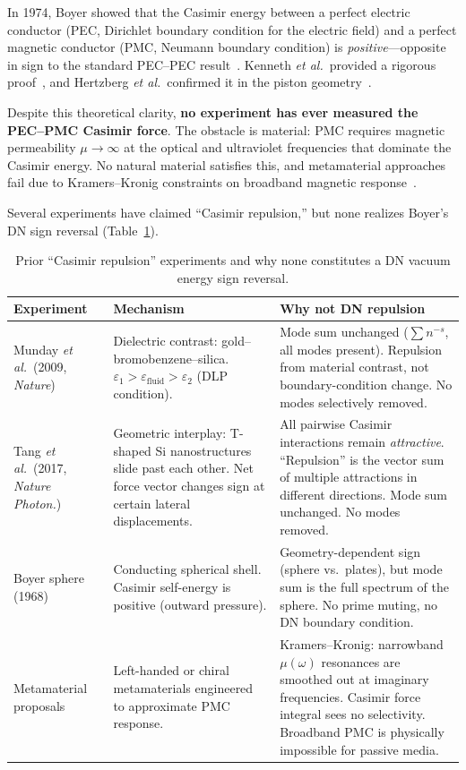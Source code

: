 \documentclass[aps,prd,twocolumn,superscriptaddress,nofootinbib]{revtex4-2}
\begin{document}
In 1974, Boyer showed that the Casimir energy between a perfect
electric conductor (PEC, Dirichlet boundary condition for the
electric field) and a perfect magnetic conductor (PMC, Neumann
boundary condition) is \emph{positive}---opposite in sign to the
standard PEC--PEC result~\cite{Boyer1974}.  Kenneth \textit{et al.}\
provided a rigorous proof~\cite{Kenneth2002}, and Hertzberg
\textit{et al.}\ confirmed it in the piston
geometry~\cite{Hertzberg2005}.

Despite this theoretical clarity, \textbf{no experiment has ever
measured the PEC--PMC Casimir force}.  The obstacle is material:
PMC requires magnetic permeability $\mu\to\infty$ at the optical
and ultraviolet frequencies that dominate the Casimir energy.
No natural material satisfies this, and metamaterial approaches
fail due to Kramers--Kronig constraints on
broadband magnetic response~\cite{Rosa2008}.

Several experiments have claimed ``Casimir repulsion,'' but none
realizes Boyer's DN sign reversal (Table~\ref{tab:prior}).

\begin{table}[b]
\caption{Prior ``Casimir repulsion'' experiments and why none
constitutes a DN vacuum energy sign reversal.}
\label{tab:prior}
\begin{ruledtabular}
\begin{tabular}{p{1.7cm}p{2.5cm}p{3.5cm}}
Experiment & Mechanism & Why not DN repulsion \\
\hline
Munday \textit{et al.}\ (2009, \textit{Nature})~\cite{Munday2009}
& Dielectric contrast: gold--bromobenzene--silica.
$\varepsilon_1>\varepsilon_\mathrm{fluid}>\varepsilon_2$ (DLP condition).
& Mode sum unchanged ($\sum n^{-s}$, all modes present).
Repulsion from material contrast, not boundary-condition
change. No modes selectively removed. \\
Tang \textit{et al.}\ (2017, \textit{Nature Photon.})~\cite{Tang2017}
& Geometric interplay: T-shaped Si nanostructures
slide past each other. Net force vector changes sign
at certain lateral displacements.
& All pairwise Casimir interactions remain \emph{attractive}.
``Repulsion'' is the vector sum of multiple attractions
in different directions. Mode sum unchanged.
No modes removed. \\
Boyer sphere (1968)~\cite{Boyer1968}
& Conducting spherical shell.
Casimir self-energy is positive (outward pressure).
& Geometry-dependent sign (sphere vs.\ plates), but mode
sum is the full spectrum of the sphere.
No prime muting, no DN boundary condition. \\
Metamaterial proposals~\cite{Rosa2008,Leonhardt2007}
& Left-handed or chiral metamaterials
engineered to approximate PMC response.
& Kramers--Kronig: narrowband $\mu(\omega)$ resonances
are smoothed out at imaginary frequencies.
Casimir force integral sees no selectivity.
Broadband PMC is physically impossible for passive media. \\
\end{tabular}
\end{ruledtabular}
\end{table}
\end{document}
